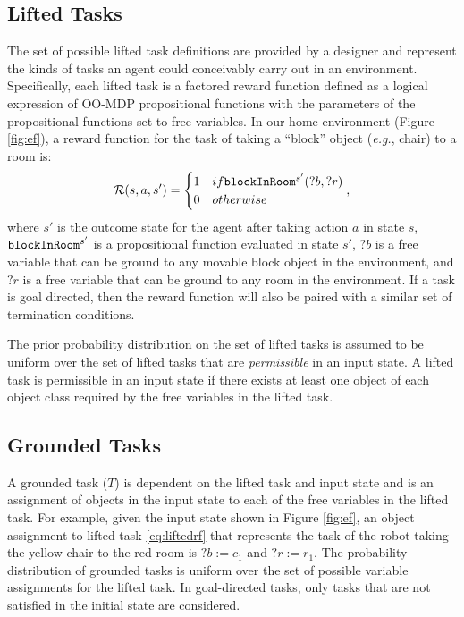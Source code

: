 \documentclass[conference]{IEEEtran}
\begin{document}
\subsection{Lifted Tasks}
The set of possible lifted task definitions are provided by a designer and represent the kinds of tasks an agent could conceivably carry out in an environment. Specifically, each lifted task is a factored reward function defined as a logical expression of OO-MDP propositional functions with the parameters of the propositional functions set to free variables. In our home environment (Figure \ref{fig:ef}), a reward function for the task of taking a ``block'' object (\emph{e.g.}, chair) to a room is:
\begin{equation}
\label{eq:liftedrf}
{\cal R}(s, a, s') = \begin{cases}
1 & \mbox{if } {\tt blockInRoom}^{s'}(?b, ?r) \\
0 & \mbox{otherwise}
\end{cases},
\end{equation}
where $s'$ is the outcome state for the agent after taking action $a$ in state $s$, ${\tt blockInRoom}^{s'}$ is a propositional function evaluated in state $s'$, $?b$ is a free variable that can be ground to any movable block object in the environment, and $?r$ is a free variable that can be ground to any room in the environment. 
If a task is goal directed, then the reward function will also be paired with a similar set of termination conditions.

The prior probability distribution on the set of lifted tasks is assumed to be uniform over the set of lifted tasks that are {\em permissible} in an input state. A lifted task is permissible in an input state if there exists at least one object of each object class required by the free variables in the lifted task.

\subsection{Grounded Tasks}
A grounded task ($T$) is dependent on the lifted task and input state and is an assignment of objects in the input state to each of the free variables in the lifted task. For example, given the input state shown in Figure \ref{fig:ef}, an object assignment to lifted task \ref{eq:liftedrf} that represents the task of the robot taking the yellow chair to the red room is $?b:=c_1$ and $?r:=r_1$. The probability distribution of grounded tasks is uniform over the set of possible variable assignments for the lifted task. In goal-directed tasks, only tasks that are not satisfied in the initial state are considered.
\end{document}
